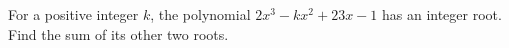 For a positive integer $k$, the polynomial $2x^3-kx^2+23x-1$ has an integer root. Find the sum of its other two roots.
